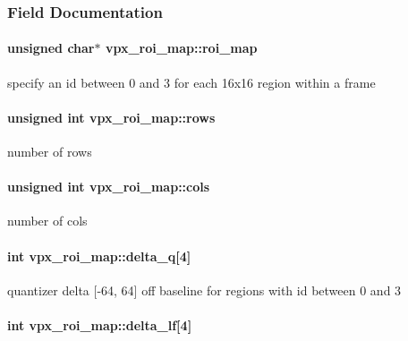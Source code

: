 \subsubsection{\-Field \-Documentation}
\hypertarget{structvpx__roi__map_aba69e211b81d622977ba07ac47b61075}{
\paragraph[{roi\-\_\-map}]{\setlength{\rightskip}{0pt plus 5cm}unsigned char$\ast$ {\bf vpx\-\_\-roi\-\_\-map\-::roi\-\_\-map}}}
\label{structvpx__roi__map_aba69e211b81d622977ba07ac47b61075}
specify an id between 0 and 3 for each 16x16 region within a frame \hypertarget{structvpx__roi__map_a3fdcecd472553d08a99ced02cda5c9a6}{
\paragraph[{rows}]{\setlength{\rightskip}{0pt plus 5cm}unsigned int {\bf vpx\-\_\-roi\-\_\-map\-::rows}}}
\label{structvpx__roi__map_a3fdcecd472553d08a99ced02cda5c9a6}
number of rows \hypertarget{structvpx__roi__map_a5458459aaf16b14b86fb0adef32757c8}{
\paragraph[{cols}]{\setlength{\rightskip}{0pt plus 5cm}unsigned int {\bf vpx\-\_\-roi\-\_\-map\-::cols}}}
\label{structvpx__roi__map_a5458459aaf16b14b86fb0adef32757c8}
number of cols \hypertarget{structvpx__roi__map_a6e7aecf1d31c329f43dcb36717b3999b}{
\paragraph[{delta\-\_\-q}]{\setlength{\rightskip}{0pt plus 5cm}int {\bf vpx\-\_\-roi\-\_\-map\-::delta\-\_\-q}\mbox{[}4\mbox{]}}}
\label{structvpx__roi__map_a6e7aecf1d31c329f43dcb36717b3999b}
quantizer delta \mbox{[}-\/64, 64\mbox{]} off baseline for regions with id between 0 and 3 \hypertarget{structvpx__roi__map_a5164be48a612bf872b81e0a86726fbed}{
\paragraph[{delta\-\_\-lf}]{\setlength{\rightskip}{0pt plus 5cm}int {\bf vpx\-\_\-roi\-\_\-map\-::delta\-\_\-lf}\mbox{[}4\mbox{]}}}
